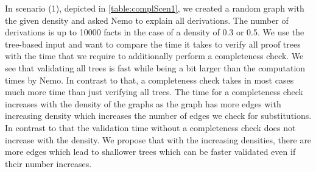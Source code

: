 \begin{table}
    \centering
    \caption{Comparision between tree validation and a completeness check in scenario 1}       
    \label{table:complScen1}
\end{table}

In scenario (1), depicted in \cref{table:complScen1}, we created a random graph with the given density and asked Nemo to explain all derivations. The number of derivations is up to 10000 facts in the case of a density of 0.3 or 0.5. We use the tree-based input and want to compare the time it takes to verify all proof trees with the time that we require to additionally perform a completeness check. We see that validating all trees is fast while being a bit larger than the computation times by Nemo. In contrast to that, a completeness check takes in most cases much more time than just verifying all trees. The time for a completeness check increases with the density of the graphs as the graph has more edges with increasing density which increases the number of edges we check for substitutions. In contrast to that the validation time without a completeness check does not increase with the density. We propose that with the increasing densities, there are more edges which lead to shallower trees which can be faster validated even if their number increases.

